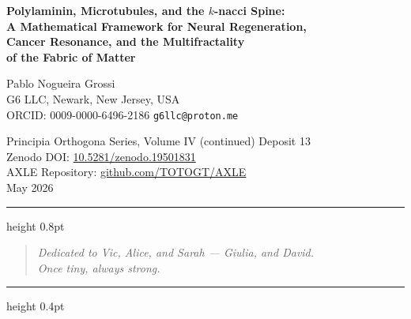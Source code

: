 \documentclass[12pt,a4paper]{article}
\begin{document}

\begin{center}
{\LARGE\bfseries\color{deepblue}
Polylaminin, Microtubules, and the $k$-nacci Spine:\\[6pt]
A Mathematical Framework for Neural Regeneration,\\[4pt]
Cancer Resonance, and the Multifractality\\[4pt]
of the Fabric of Matter
}

\vspace{1.2em}
{\large Pablo Nogueira Grossi}\\[4pt]
{\normalsize G6 LLC, Newark, New Jersey, USA}\\
{\normalsize ORCID: 0009-0000-6496-2186
\quad \texttt{g6llc@proton.me}}

\vspace{0.8em}
{\normalsize
Principia Orthogona Series, Volume IV (continued)
\quad Deposit 13\\
Zenodo DOI:
\href{https://doi.org/10.5281/zenodo.19501831}{10.5281/zenodo.19501831}\\
AXLE Repository:
\href{https://github.com/TOTOGT/AXLE}{github.com/TOTOGT/AXLE}\\[4pt]
May 2026
}

\vspace{1em}
\hrule height 0.8pt
\vspace{0.5em}

\begin{quote}\centering\itshape\small
Dedicated to Vic, Alice, and Sarah ---
Giulia, and David.\\
Once tiny, always strong.
\end{quote}

\hrule height 0.4pt
\end{center}

\vspace{0.8em}

\end{document}
